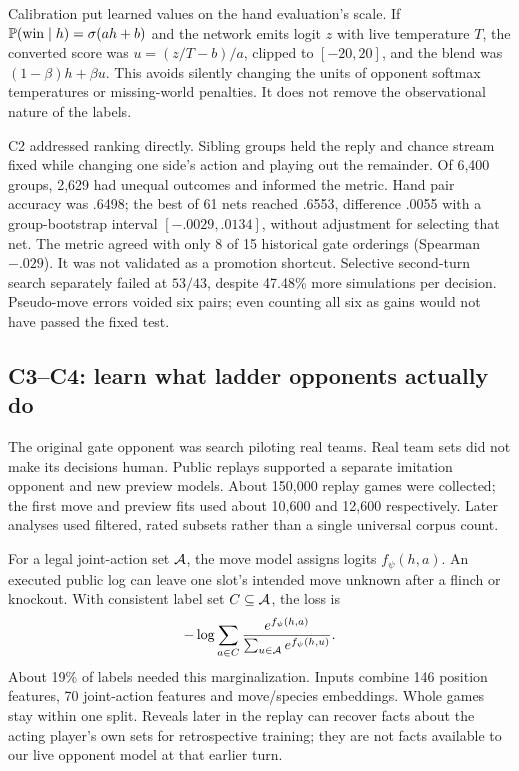 Calibration put learned values on the hand evaluation's scale. If
$\mathbb{P}(\mathrm{win}\mid h)=\sigma(ah+b)$ and the network emits logit $z$
with live temperature $T$, the converted score was
$u=(z/T-b)/a$, clipped to $[-20,20]$, and the blend was
$(1-\beta)h+\beta u$. This avoids silently changing the units of opponent
softmax temperatures or missing-world penalties. It does not remove the
observational nature of the labels.

C2 addressed ranking directly. Sibling groups held the reply and chance
stream fixed while changing one side's action and playing out the remainder.
Of 6,400 groups, 2,629 had unequal outcomes and informed the metric. Hand
pair accuracy was .6498; the best of 61 nets reached .6553, difference .0055
with a group-bootstrap interval $[-.0029,.0134]$, without adjustment for
selecting that net. The metric agreed with only 8 of 15 historical gate
orderings (Spearman $-.029$). It was not validated as a promotion shortcut.
Selective second-turn search separately failed at $53/43$, despite 47.48\%
more simulations per decision. Pseudo-move errors voided six pairs; even
counting all six as gains would not have passed the fixed test.


\subsection{C3--C4: learn what ladder opponents actually do}
The original gate opponent was search piloting real teams. Real team sets
did not make its decisions human. Public replays supported a separate
imitation opponent and new preview models. About 150,000 replay games were
collected; the first move and preview fits used about 10,600 and 12,600
respectively. Later analyses used filtered, rated subsets rather than a
single universal corpus count.

For a legal joint-action set $\mathcal{A}$, the move model assigns logits
$f_\psi(h,a)$. An executed public log can leave one slot's intended move
unknown after a flinch or knockout. With consistent label set
$C\subseteq\mathcal{A}$, the loss is
\begin{equation}
  -\log\sum_{a\in C}\frac{e^{f_\psi(h,a)}}{\sum_{u\in\mathcal{A}}e^{f_\psi(h,u)}}.
  \label{eq:human-marginal}
\end{equation}
About 19\% of labels needed this marginalization. Inputs combine 146
position features, 70 joint-action features and move/species embeddings.
Whole games stay within one split. Reveals later in the replay can recover
facts about the acting player's own sets for retrospective training; they
are not facts available to our live opponent model at that earlier turn.

